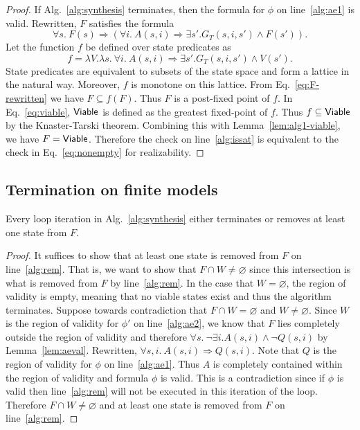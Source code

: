 \begin{proof}
If Alg.~\ref{alg:synthesis} terminates, then the
formula for $\phi$ on line~\ref{alg:ae1} is valid. Rewritten, $F$
satisfies the formula
\begin{equation}
  \forall s.~F(s) \Rightarrow \left(\forall i.~ A(s,i) \Rightarrow \exists
    s'.G_{T}(s,i,s') \land F(s')\right).
  \label{eq:F-rewritten}
\end{equation}
Let the function $f$ be defined over state predicates as
  \begin{equation}
    f = \lambda V. \lambda s.~ \forall i.~ A(s,i) \Rightarrow \exists s'.G_{T}(s,i,s') \land V(s').
    \label{eq:f-fixed-point}
  \end{equation}
  State predicates are equivalent to subsets of the state space and
  form a lattice in the natural way. Moreover, $f$ is monotone on this
  lattice. From Eq.~\ref{eq:F-rewritten} we have
  $F \subseteq f(F)$. Thus $F$ is a post-fixed point of $f$. In
  Eq.~\ref{eq:viable}, ${\mathsf {Viable}}$ is defined as the greatest
  fixed-point of $f$. Thus $f \subseteq {\mathsf {Viable}}$ by the Knaster-Tarski
  theorem. Combining this with Lemma~\ref{lem:alg1-viable}, we have
  $F = {\mathsf {Viable}}$. Therefore the check on line~\ref{alg:issat} is equivalent to the
  check in Eq.~\ref{eq:nonempty} for realizability.
\end{proof}

\subsection{Termination on finite models}
\label{sec:termfinal}
\begin{lemma}
Every loop iteration in Alg.~\ref{alg:synthesis} either
terminates or removes at least one state from $F$.
\label{lem:progress}
\end{lemma}
\begin{proof}
  It suffices to show that at least one state is removed from $F$ on
  line~\ref{alg:rem}. That is, we want to show that $F \cap W \neq \varnothing$ since
  this intersection is what is removed from $F$ by line~\ref{alg:rem}.  In the case that  $W = \varnothing$, the region of validity is empty, meaning that no viable states exist and thus the algorithm terminates. Suppose
  towards contradiction that $F \cap W = \varnothing$ and $W \neq \varnothing$. Since $W$ is the
  region of validity for $\phi'$ on line~\ref{alg:ae2}, we know that $F$ lies
  completely outside the region of validity and therefore
  $\forall s.~ \neg \exists i. A(s,i) \land \neg Q(s, i)$
  by Lemma~\ref{lem:aeval}. Rewritten,
  $\forall s, i.~ A(s, i) \Rightarrow Q(s, i)$. Note that $Q$ is the
  region of validity for $\phi$ on line~\ref{alg:ae1}. Thus $A$ is completely
  contained within the region of validity and formula $\phi$ is valid.
  This is a contradiction since if $\phi$ is valid then line~\ref{alg:rem} will
  not be executed in this iteration of the loop. Therefore
  $F \cap W \neq \varnothing$ and at least one state is removed from $F$
  on line~\ref{alg:rem}.
\end{proof}

